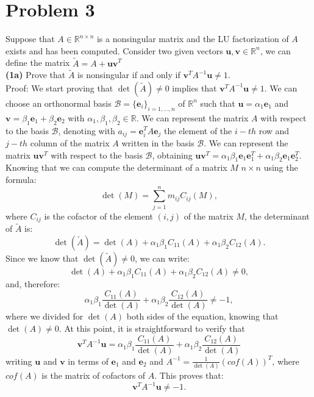 \documentclass[a4paper]{report}
\newcommand{\R}{\mathbb{R}}
\numberwithin{equation}{chapter}
\begin{document}
\section*{Problem 3}
Suppose that $A \in \R^{n \times n}$ is a nonsingular matrix and the LU factorization of $A$ exists and has been computed. Consider two given vectors $\textbf{u},\textbf{v}\in \R^n$, we can define the matrix $\tilde{A} = A + \textbf{u}\textbf{v}^T$\\
\textbf{(1a)} Prove that $\tilde{A}$ is nonsingular if and only if $\textbf{v}^TA^{-1}\textbf{u} \neq 1$.\\
Proof: We start proving that $\det(\tilde{A})\neq 0 $ implies that $\textbf{v}^TA^{-1}\textbf{u} \neq 1$. We can choose an orthonormal basis $\mathcal{B} =\{\mathbf{e}_i\}_{i=1,\dots,n}$ of $\R^n$ such that $\mathbf{u} = \alpha_1 \mathbf{e}_1$ and $\mathbf{v} = \beta_1 \mathbf{e}_1 + \beta_2 \mathbf{e}_2$ with $\alpha_1, \beta_1, \beta_2 \in \R$. We can represent the matrix $A$ with respect to the basis $\mathcal{B}$, denoting with $a_{ij} = \textbf{e}^T_i A \textbf{e}_j $  the element of the $i-th$ row and $j-th$ column of the matrix $A$ written in the basis $\mathcal{B}$. We can represent the matrix $ \textbf{u}\textbf{v}^T$ with respect to the basis $\mathcal{B}$, obtaining $\textbf{u}\textbf{v}^T = \alpha_1 \beta_1 \textbf{e}_1 \textbf{e}_1^T +  \alpha_1 \beta_2 \textbf{e}_1 \textbf{e}_2^T$. Knowing that we can compute the determinant of a matrix $M$ $n\times n$ using the formula:
\begin{equation}\label{key}
	\det(M) = \sum_{j=1}^{n} m_{ij} C_{ij}(M),
\end{equation}
where $C_{ij}$ is the cofactor of the element $(i,j)$ of the matrix $M$, the determinant of $\tilde{A}$ is:
\begin{equation}\label{key}
	\det(\tilde{A}) = \det(A) + \alpha_1 \beta_1 C_{11}(A) + \alpha_1 \beta_2 C_{12}(A).
\end{equation}
Since we know that $ \det(\tilde{A}) \neq 0$, we can write:
\begin{equation}\label{key}
	 \det(A) + \alpha_1 \beta_1 C_{11}(A) + \alpha_1 \beta_2 C_{12}(A) \neq 0,
\end{equation}
and, therefore:
\begin{equation}\label{key}
	 \alpha_1 \beta_1 \frac{C_{11}(A)}{\det(A)} + \alpha_1 \beta_2 \frac{C_{12}(A)}{\det(A)} \neq -1,
\end{equation}
where we divided for $\det(A)$ both sides of the equation, knowing that $\det(A) \neq 0$. At this point, it is straightforward to verify that 
\begin{equation}\label{key}
	\textbf{v}^T A^{-1} \textbf{u} = \alpha_1 \beta_1 \frac{C_{11}(A)}{\det(A)} + \alpha_1 \beta_2 \frac{C_{12}(A)}{\det(A)}
\end{equation}
writing $\textbf{u}$ and $\textbf{v}$ in terms of $\textbf{e}_1$ and $\textbf{e}_2$ and $A^{-1} = \frac{1}{\det(A)} (cof(A))^T$, where $cof(A)$ is the matrix of cofactors of $A$. This proves that:
\begin{equation}\label{key}
	\textbf{v}^T A^{-1} \textbf{u} \neq -1.
\end{equation}
\end{document}
